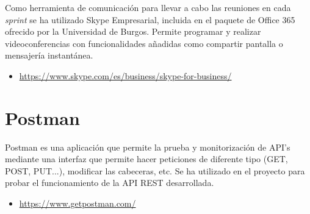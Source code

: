 Como herramienta de comunicación para llevar a cabo las reuniones en cada \emph{sprint} se ha utilizado Skype Empresarial, incluida en el paquete de Office 365 ofrecido por la Universidad de Burgos. Permite programar y realizar videoconferencias con funcionalidades añadidas como compartir pantalla o mensajería instantánea.

\begin{itemize}
	\item \url{https://www.skype.com/es/business/skype-for-business/}
\end{itemize}

\section{Postman}

Postman es una aplicación que permite la prueba y monitorización de API's mediante una interfaz que permite hacer peticiones de diferente tipo (GET, POST, PUT...), modificar las cabeceras, etc. Se ha utilizado en el proyecto para probar el funcionamiento de la API REST desarrollada.

\begin{itemize}
	\item \url{https://www.getpostman.com/}
\end{itemize}